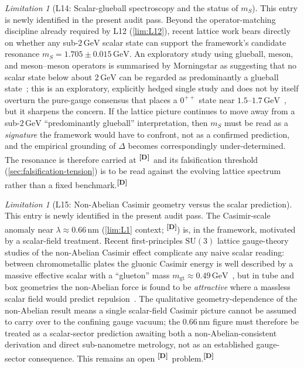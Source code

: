 \documentclass[12pt,a4paper,twoside]{article}
\theoremstyle{plain}
\theoremstyle{definition}
\theoremstyle{remark}
\newtheorem{limitation}[theorem]{Limitation}
\newcommand{\GeV}{\,\mathrm{GeV}}
\newcommand{\catmark}[1]{\textsuperscript{\textsf{\textbf{[#1]}}}}
\begin{document}
\begin{limitation}[L14: Scalar-glueball spectroscopy and the status of $m_S$]
\label{lim:L14}
This entry is newly identified in the present audit pass. Beyond the operator-matching discipline already required by L12 (\cref{lim:L12}), recent lattice work bears directly on whether any sub-$2\,\mathrm{GeV}$ scalar state can support the framework's candidate resonance $m_S = 1.705 \pm 0.015\GeV$. An exploratory study using glueball, meson, and meson--meson operators is summarised by Morningstar as suggesting that no scalar state below about $2\,\mathrm{GeV}$ can be regarded as predominantly a glueball state~\cite{morningstar2024}; this is an exploratory, explicitly hedged single study and does not by itself overturn the pure-gauge consensus that places a $0^{++}$ state near $1.5$--$1.7\,\mathrm{GeV}$~\cite{athenodorou2020,morningstar1999}, but it sharpens the concern. If the lattice picture continues to move away from a sub-$2\,\mathrm{GeV}$ ``predominantly glueball'' interpretation, then $m_S$ must be read as a \emph{signature} the framework would have to confront, not as a confirmed prediction, and the empirical grounding of $\Delta$ becomes correspondingly under-determined. The resonance is therefore carried at \catmark{D}\ and its falsification threshold (\cref{sec:falsification-tension}) is to be read against the evolving lattice spectrum rather than a fixed benchmark.\catmark{D}
\end{limitation}

\begin{limitation}[L15: Non-Abelian Casimir geometry versus the scalar prediction]
\label{lim:L15}
This entry is newly identified in the present audit pass. The Casimir-scale anomaly near $\lambda \approx 0.66\,\mathrm{nm}$ (\cref{lim:L1} context; \catmark{D}) is, in the framework, motivated by a scalar-field treatment. Recent first-principles $\mathrm{SU}(3)$ lattice gauge-theory studies of the non-Abelian Casimir effect complicate any naive scalar reading: between chromometallic plates the gluonic Casimir energy is well described by a massive effective scalar with a ``glueton'' mass $m_{\mathrm{gt}} \approx 0.49\,\mathrm{GeV}$~\cite{chernodub2023}, but in tube and box geometries the non-Abelian force is found to be \emph{attractive} where a massless scalar field would predict repulsion~\cite{ngwenya2025}. The qualitative geometry-dependence of the non-Abelian result means a single scalar-field Casimir picture cannot be assumed to carry over to the confining gauge vacuum; the $0.66\,\mathrm{nm}$ figure must therefore be treated as a scalar-sector prediction awaiting both a non-Abelian-consistent derivation and direct sub-nanometre metrology, not as an established gauge-sector consequence. This remains an open \catmark{D}\ problem.\catmark{D}
\end{limitation}
\end{document}
